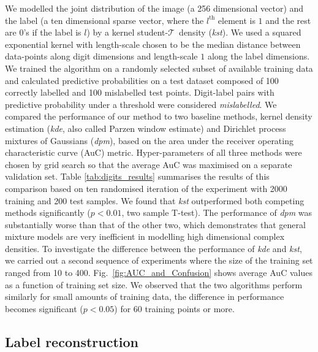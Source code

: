\documentclass[twoside]{article}
\newcommand{\ourmethod}{kst}
\newcommand{\studentt}{student-$\mathcal{T}$\ }
\begin{document}
We modelled the joint distribution of the image (a 256 dimensional vector) and the label (a ten dimensional sparse vector, where the $l^{\mbox{th}}$ element is $1$ and the rest are $0$'s if the label is $l$) by a kernel \studentt density (\emph{\ourmethod}). We used a squared exponential kernel with length-scale chosen to be the median distance between data-points along digit dimensions and length-scale $1$ along the label dimensions. We trained the algorithm on a randomly selected subset of available training data and calculated predictive probabilities on a test dataset composed of 100 correctly labelled and 100 mislabelled test points. Digit-label pairs with predictive probability under a threshold were considered \emph{mislabelled}. We compared the performance of our method to two baseline methods, kernel density estimation (\emph{kde}, also called Parzen window estimate) and Dirichlet process mixtures of Gaussians (\emph{dpm}), based on the area under the receiver operating characteristic curve (AuC) metric. Hyper-parameters of all three methods were chosen by grid search so that the average AuC was maximised on a separate validation set. Table \ref{tab:digits_results} summarises the results of this comparison based on ten randomised iteration of the experiment with 2000 training and 200 test samples. We found that \emph{\ourmethod} outperformed both competing methods significantly ($p<0.01$, two sample T-test). The performance of \emph{dpm} was substantially worse than that of the other two, which demonstrates that general mixture models are very inefficient in modelling high dimensional complex densities. To investigate the difference between the performance of \emph{kde} and \emph{\ourmethod}, we carried out a second sequence of experiments where the size of the training set ranged from 10 to 400. Fig.~\ref{fig:AUC_and_Confusion} shows average AuC values as a function of training set size. We observed that the two algorithms perform similarly for small amounts of training data, the difference in performance becomes significant ($p<0.05$) for 60 training points or more.

\subsection{Label reconstruction\label{sec:classification}}
\end{document}
